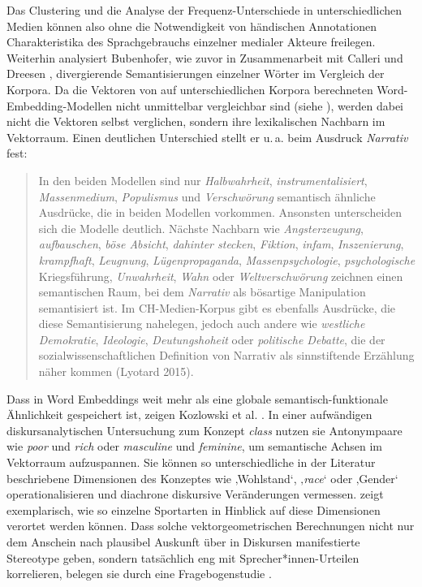 Das Clustering und die Analyse der Frequenz-Unterschiede in unterschiedlichen Medien können also ohne die Notwendigkeit von händischen Annotationen Charakteristika des Sprachgebrauchs einzelner medialer Akteure freilegen. Weiterhin analysiert Bubenhofer, wie zuvor in Zusammenarbeit mit Calleri und Dreesen \autocite*{bubenhoferPolitisierungRechtspopulistischenMedien2019}, divergierende Semantisierungen einzelner Wörter im Vergleich der Korpora. Da die Vektoren von auf unterschiedlichen Korpora berechneten Word-Embedding-Modellen nicht unmittelbar vergleichbar sind (siehe ), werden dabei nicht die Vektoren selbst verglichen, sondern ihre lexikalischen Nachbarn im Vektorraum. Einen deutlichen Unterschied stellt er u.\,a. beim Ausdruck \emph{Narrativ} fest:

\begin{quote}
In den beiden Modellen sind nur \emph{Halbwahrheit}, \emph{instrumentalisiert}, \emph{Massenmedium}, \emph{Populismus} und \emph{Verschwörung} semantisch ähnliche Ausdrücke, die in beiden Modellen vorkommen. Ansonsten unterscheiden sich die Modelle deutlich. Nächste Nachbarn wie \emph{Angsterzeugung}, \emph{aufbauschen}, \emph{böse Absicht}, \emph{dahinter stecken}, \emph{Fiktion}, \emph{infam}, \emph{Inszenierung}, \emph{krampfhaft}, \emph{Leugnung}, \emph{Lügenpropaganda}, \emph{Massenpsychologie}, \emph{psychologische} Kriegsführung, \emph{Unwahrheit}, \emph{Wahn} oder \emph{Weltverschwörung} zeichnen einen semantischen Raum, bei dem \emph{Narrativ} als bösartige Manipulation semantisiert ist. Im CH-Medien-Korpus gibt es ebenfalls Ausdrücke, die diese Semantisierung nahelegen, jedoch auch andere wie \emph{westliche Demokratie}, \emph{Ideologie}, \emph{Deutungshoheit} oder \emph{politische Debatte}, die der sozialwissenschaftlichen Definition von Narrativ als sinnstiftende Erzählung näher kommen (Lyotard 2015). \autocite[214]{bubenhoferExplorationSemantischerRaeume2022}
\end{quote}

Dass in Word Embeddings weit mehr als eine globale semantisch-funktionale Ähnlichkeit gespeichert ist, zeigen Kozlowski et al. \autocite*{kozlowskiGeometryCultureAnalyzing2019}. In einer aufwändigen diskursanalytischen Untersuchung zum Konzept \emph{class} nutzen sie Antonympaare wie \emph{poor} und \emph{rich} oder \emph{masculine} und \emph{feminine}, um semantische Achsen im Vektorraum aufzuspannen. Sie können so unterschiedliche in der Literatur beschriebene Dimensionen des Konzeptes wie ‚Wohlstand`, ‚\emph{race}` oder ‚Gender` operationalisieren und diachrone diskursive Veränderungen vermessen.  zeigt exemplarisch, wie so einzelne Sportarten in Hinblick auf diese Dimensionen verortet werden können. Dass solche vektorgeometrischen Berechnungen nicht nur dem Anschein nach plausibel Auskunft über in Diskursen manifestierte Stereotype geben, sondern tatsächlich eng mit Sprecher*innen-Urteilen korrelieren, belegen sie durch eine Fragebogenstudie \autocite[siehe auch aus kognitionswissenschaftler Perspektive][]{grandSemanticProjectionRecovers2022}.

